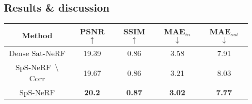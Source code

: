 \documentclass{isprs} %
\newcommand{\Nerf}{{NeRF}}
\newcommand{\OurNeRFShort}{{SpS-NeRF}}
\newcommand{\er}[1]{\textcolor{magenta}{#1}} %
\begin{document}
\subsection{Results \& discussion}

\begin{table*}[htbp]
\scriptsize
\centering
\begin{tabular}{|c|c|c|c|c|}
\hline 
Method & \footnotesize  PSNR $\uparrow$ & \footnotesize SSIM $\uparrow$ & \footnotesize  MAE$_{in}$ $\downarrow$ & \footnotesize MAE$_{out}$ $\downarrow$ \\\hline\hline
\footnotesize Dense Sat-\Nerf & 19.39 & 0.86 & 3.58 & 7.91 \\\hline
\footnotesize \OurNeRFShort~$\setminus$Corr & 19.67 & 0.86 & 3.21 & 8.03 \\\hline
\footnotesize \OurNeRFShort & \textbf{20.2} & \textbf{0.87} & \textbf{3.02} & \textbf{7.77} \\\hline
\end{tabular}
\caption{\textbf{Ablation experiment}.  Quantitative metrics on \Nerf~variants trained with 2 views from DFC2019. Adding dense supervision (Dense Sat-\Nerf), guided ray sampling (\OurNeRFShort~$\setminus$Corr) and uncertainty measures (\OurNeRFShort) improve the novel view generation and surface recovery metrics.}%
\label{table:ablation}
\end{table*}
\end{document}

